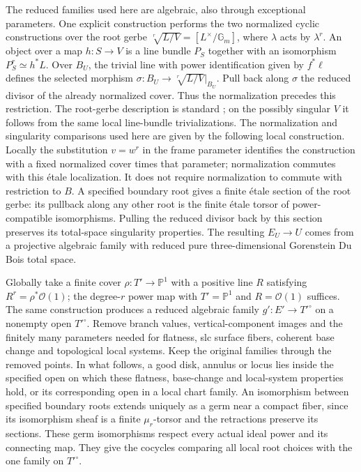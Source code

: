 The reduced families used here are algebraic, also through exceptional
parameters.  One explicit construction performs the two normalized
cyclic constructions over the root gerbe
$\sqrt[r]{L/V}=[L^\times/\mathbb G_m]$, where
$\lambda$ acts by $\lambda^r$.  An object over a map $h:S\to V$
is a line bundle $P_S$ together with an isomorphism
$P_S^r\simeq h^*L$.  Over $B_U$, the trivial line with power
identification given by $f^*\ell$ defines the selected morphism
$\sigma:B_U\to\sqrt[r]{L/V}|_{B_U}$.  Pull back along $\sigma$
the reduced divisor of the already normalized cover.  Thus the
normalization precedes this restriction. The root-gerbe description is standard
\cite[Definition~2.2 and Proposition~2.3]{AndreiniJiangTseng2015};
on the possibly singular $V$ it follows from the same local line-bundle
trivializations. The normalization and singularity comparisons used
here are given by the following local construction.  Locally the substitution $v=w^r$ in the frame parameter
identifies the construction with a fixed normalized cover times that
parameter; normalization commutes with this étale localization.
It does not require normalization to commute with restriction to $B$.
A specified boundary root gives a finite étale section of the root
gerbe: its pullback along any other root is the finite étale torsor
of power-compatible isomorphisms.  Pulling the reduced divisor back
by this section preserves its total-space singularity properties.
The resulting $E_U\to U$ comes from a projective algebraic family
with reduced pure three-dimensional Gorenstein Du Bois total space.

Globally take a finite cover $\rho:T'\to\mathbb P^1$ with a positive
line $R$ satisfying $R^r=\rho^*\mathcal O(1)$; the degree-$r$ power
map with $T'=\mathbb P^1$ and $R=\mathcal O(1)$ suffices.
The same construction produces a reduced algebraic family
$g':E'\to T'^\circ$ on a nonempty open $T'^\circ$.  Remove branch values, vertical-component
images and the finitely many parameters needed for flatness, slc
surface fibers, coherent base change and topological local systems.
Keep the original families through the removed points.  In what
follows, a good disk, annulus or locus lies inside the specified open
on which these flatness, base-change and local-system properties
hold, or its corresponding open in a local chart family.
An isomorphism between specified boundary roots extends uniquely as
a germ near a compact fiber, since its isomorphism sheaf is a finite
$\mu_r$-torsor and the retractions preserve its sections.  These germ
isomorphisms respect every actual ideal power and its connecting
map.  They give the cocycles comparing all local root choices with
the one family on $T'^\circ$.

